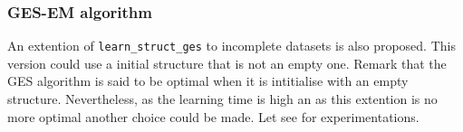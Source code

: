 
\subsubsection{GES-EM algorithm}

An extention of \texttt{learn\_struct\_ges} to incomplete datasets is also
proposed.
This version could use a initial structure that is not an empty one.
Remark that the GES algorithm is said to be optimal when it is
intitialise with an empty structure.
Nevertheless, as the learning time is high an as this extention is no
more optimal another choice could be made.
Let see \cite{Bor06} for experimentations.
\vspace*{-\baselineskip}


